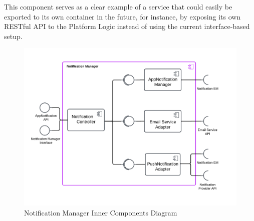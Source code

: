 This component serves as a clear example of a service that could easily be exported to its own container in the future, for instance, by exposing its own RESTful API to the Platform Logic instead of using the current interface-based setup.


\begin{figure}[H]
    \centering
    \includegraphics[width=0.8\linewidth]{Latex/Images/DD/Component2.png}
    \caption{Notification Manager Inner Components Diagram}
    \label{fig:NotificationComponents}
\end{figure}
